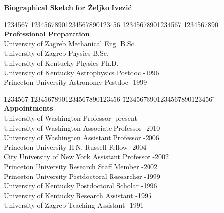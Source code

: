 



\def\ref{\hangindent 2pc \hangafter 1}
\def\Bline#1{\hskip 0.3in $\bullet$ #1 \\ \smallskip}
\def\Sline#1{\hskip 0.6in #1 \\}
\def\line#1{#1 \\}


{\bf  Biographical Sketch for \v{Z}eljko Ivezi\'{c}} 
\smallskip


\begin{tabbing}
1234567 \= 12345678901234567890123456  \= 12345678901234567  \= 1234567890 \= \kill
\hskip 0.4in {\bf  Professional Preparation} \smallskip
\\
\>  University of Zagreb   \>  Mechanical Eng.  \> B.Sc.    \\
\>  University of Zagreb   \>  Physics          \> B.Sc.    \\
\>  University of Kentucky \>  Physics          \> Ph.D.    \\
\>  University of Kentucky \>  Astrophysics     \> Postdoc -1996 \\
\>  Princeton University   \>  Astronomy        \> Postdoc -1999 \\
\end{tabbing}

\vskip -0.8in
\phantom{x}
\vskip -0.8in

\begin{tabbing}
1234567 \= 12345678901234567890123456  \= 12345678901234567890123456 \= \kill
\hskip 0.4in {\bf  Appointments} \smallskip
\\
\> University of Washington  \> Professor  -present \\ 
\> University of Washington  \> Associate Professor  -2010\\ 
\> University of Washington  \> Assistant Professor  -2006 \\ 
\> Princeton University   \> H.N. Russell Fellow     -2004 \\ 
\> City University of New York   \> Assistant Professor   -2002 \\ 
\> Princeton University   \> Research Staff Member   -2002 \\ 
\> Princeton University   \> Postdoctoral Researcher -1999 \\
\> University of Kentucky \> Postdoctoral Scholar    -1996 \\
\> University of Kentucky \> Research Assistant      -1995 \\
\> University of Zagreb   \> Teaching Assistant      -1991 \\
\end{tabbing}

